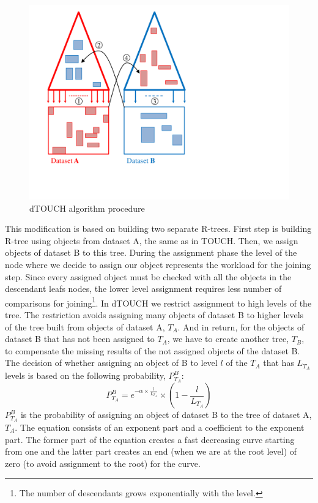\documentclass{vldb}
\newcommand{\SJ}{TOUCH}
\newcommand{\dSJ}{dTOUCH}
\begin{document}
\begin{figure}[htb]
    \begin{center}
        \includegraphics[width=.8\columnwidth]{figures/DTouch}
        \caption{{\dSJ} algorithm procedure}
        \label{fig:DTOUCH}
      \end{center}
\end{figure}

This modification is based on building two separate R-trees. First step is building R-tree using objects from dataset A, the same as in {\SJ}. Then, we assign objects of dataset B to this tree. During the assignment phase the level of the node where we decide to assign our object represents the workload for the joining step. Since every assigned object must be checked with all the objects in the descendant leafs nodes, the lower level assignment requires less number of comparisons for joining\footnote{The number of descendants grows exponentially with the level.}. In dTOUCH we restrict assignment to high levels of the tree. The restriction avoids assigning many objects of dataset B to higher levels of the tree built from objects of dataset A, $T_A$. And in return, for the objects of dataset B that has not been assigned to $T_A$, we have to create another tree, $T_B$, to compensate the missing results of the not assigned objects of the dataset B. The decision of whether assigning an object of B to level $l$ of the $T_A$ that has $L_{T_A}$ levels is based on the following probability, $P^{B}_{T_A}$:
\begin{equation*}
{P^{B}_{T_A}}=e^{-\alpha\times\frac{l}{L_{T_A}}}\times(1-\frac{l}{L_{T_A}})
\end{equation*}
$P^{B}_{T_A}$ is the probability of assigning an object of dataset B to the tree of dataset A, $T_A$. The equation consists of an exponent part and a coefficient to the exponent part. The former part of the equation creates a fast decreasing curve starting from one and the latter part creates an end (when we are at the root level) of zero (to avoid assignment to the root) for the curve.  
\end{document}
